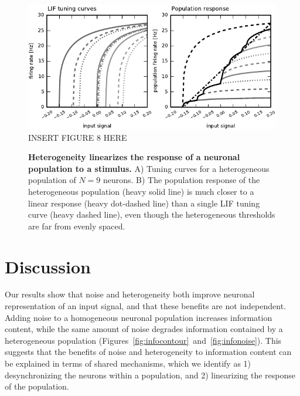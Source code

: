 \documentclass[12pt]{article}
\begin{document}
\begin{figure}
  \ifx\hidefigures\undefined
    \centering
    \includegraphics[width=\textwidth]{figure8_tuninghetero.pdf}
  \else
    INSERT FIGURE 8 HERE
  \fi
  \caption{
    \textbf{Heterogeneity linearizes the response of a neuronal population to a stimulus.} A) Tuning curves for a heterogeneous population of $N = 9$ neurons. B) The population response of the heterogeneous population (heavy solid line) is much closer to a linear response (heavy dot-dashed line) than a single LIF tuning curve (heavy dashed line), even though the heterogeneous thresholds are far from evenly spaced.
  }
  \label{fig:tuninghetero}
\end{figure}


\section{Discussion}
\label{scn:discussion}

Our results show that noise and heterogeneity both improve neuronal representation of an input signal, and that these benefits are not independent. Adding noise to a homogeneous neuronal population increases information content, while the same amount of noise degrades information contained by a heterogeneous population (Figures~\ref{fig:infocontour}~and~\ref{fig:infonoise}). This suggests that the benefits of noise and heterogeneity to information content can be explained in terms of shared mechanisms, which we identify as 1) desynchronizing the neurons within a population, and 2) linearizing the response of the population.
\end{document}

